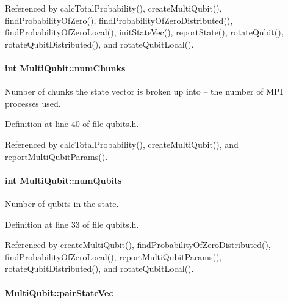 Referenced by calc\+Total\+Probability(), create\+Multi\+Qubit(), find\+Probability\+Of\+Zero(), find\+Probability\+Of\+Zero\+Distributed(), find\+Probability\+Of\+Zero\+Local(), init\+State\+Vec(), report\+State(), rotate\+Qubit(), rotate\+Qubit\+Distributed(), and rotate\+Qubit\+Local().

\paragraph[{\texorpdfstring{num\+Chunks}{numChunks}}]{\setlength{\rightskip}{0pt plus 5cm}int Multi\+Qubit\+::num\+Chunks}\hypertarget{structMultiQubit_acd43f2f57991709c9e94f73662c972b2}{}\label{structMultiQubit_acd43f2f57991709c9e94f73662c972b2}


Number of chunks the state vector is broken up into -- the number of M\+PI processes used. 



Definition at line 40 of file qubits.\+h.



Referenced by calc\+Total\+Probability(), create\+Multi\+Qubit(), and report\+Multi\+Qubit\+Params().

\paragraph[{\texorpdfstring{num\+Qubits}{numQubits}}]{\setlength{\rightskip}{0pt plus 5cm}int Multi\+Qubit\+::num\+Qubits}\hypertarget{structMultiQubit_ab5b9795bdc6fb5855e1974dcbbaeb36f}{}\label{structMultiQubit_ab5b9795bdc6fb5855e1974dcbbaeb36f}


Number of qubits in the state. 



Definition at line 33 of file qubits.\+h.



Referenced by create\+Multi\+Qubit(), find\+Probability\+Of\+Zero\+Distributed(), find\+Probability\+Of\+Zero\+Local(), report\+Multi\+Qubit\+Params(), rotate\+Qubit\+Distributed(), and rotate\+Qubit\+Local().

\paragraph[{\texorpdfstring{pair\+State\+Vec}{pairStateVec}}]{ Multi\+Qubit\+::pair\+State\+Vec}\hypertarget{structMultiQubit_a76f7db4eab52d2b30f58f973ada809c5}{}\label{structMultiQubit_a76f7db4eab52d2b30f58f973ada809c5}


